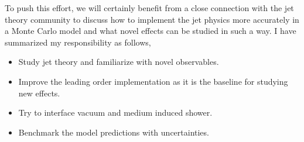 \documentclass[10pt,a4paper]{article}
\begin{document}
To push this effort, we will certainly benefit from a close connection with the jet theory community to discuss how to implement the jet physics more accurately in a Monte Carlo model and what novel effects can be studied in such a way. I have summarized my responsibility as follows,
\begin{itemize}
\item Study jet theory and familiarize with novel observables.
\item Improve the leading order implementation as it is  the baseline for studying new effects.
\item Try to interface vacuum and medium induced shower.
\item Benchmark the model predictions with uncertainties.
\end{itemize}



\end{document}
